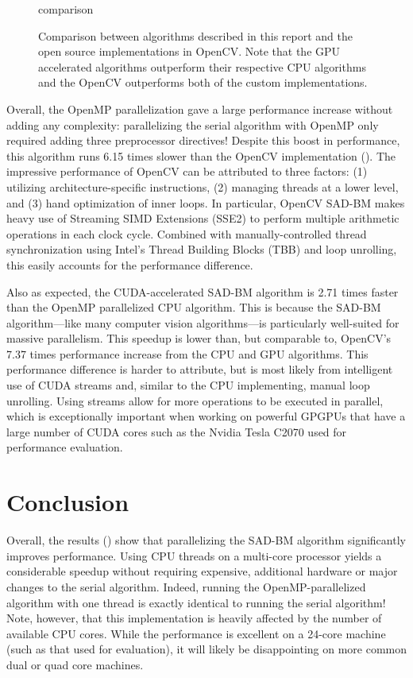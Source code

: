 \documentclass{article}
\begin{document}
\begin{figure}
    \centering
    {comparison}
    \caption{
        Comparison between algorithms described in this report and the open
        source implementations in OpenCV. Note that the GPU accelerated
        algorithms outperform their respective CPU algorithms and the OpenCV
        outperforms both of the custom implementations.
    }
    \label{fig:perf-comp}
\end{figure}

Overall, the OpenMP parallelization gave a large performance increase without
adding any complexity: parallelizing the serial algorithm with OpenMP only
required adding three preprocessor directives! Despite this boost in
performance, this algorithm runs 6.15 times slower than the OpenCV
implementation (). The impressive performance of OpenCV can
be attributed to three factors: (1) utilizing architecture-specific
instructions, (2) managing threads at a lower level, and (3) hand optimization
of inner loops.  In particular, OpenCV SAD-BM makes heavy use of Streaming SIMD
Extensions (SSE2) to perform multiple arithmetic operations in each clock
cycle. Combined with manually-controlled thread synchronization using Intel's
Thread Building Blocks (TBB) and loop unrolling, this easily accounts for the
performance difference.

Also as expected, the CUDA-accelerated SAD-BM algorithm is 2.71 times faster
than the OpenMP parallelized CPU algorithm. This is because the SAD-BM
algorithm---like many computer vision algorithms---is particularly well-suited
for massive parallelism. This speedup is lower than, but comparable to,
OpenCV's 7.37 times performance increase from the CPU and GPU algorithms. This
performance difference is harder to attribute, but is most likely from
intelligent use of CUDA streams and, similar to the CPU implementing, manual
loop unrolling. Using streams allow for more operations to be executed in
parallel, which is exceptionally important when working on powerful GPGPUs that
have a large number of CUDA cores such as the Nvidia Tesla C2070 used for
performance evaluation.

\section{Conclusion}
\label{sec:conc}
Overall, the results () show that parallelizing the SAD-BM
algorithm significantly improves performance. Using CPU threads on a multi-core
processor yields a considerable speedup without requiring expensive, additional
hardware or major changes to the serial algorithm. Indeed, running the
OpenMP-parallelized algorithm with one thread is exactly identical to running
the serial algorithm! Note, however, that this implementation is heavily
affected by the number of available CPU cores. While the performance is
excellent on a 24-core machine (such as that used for evaluation), it will
likely be disappointing on more common dual or quad core machines.
\end{document}
